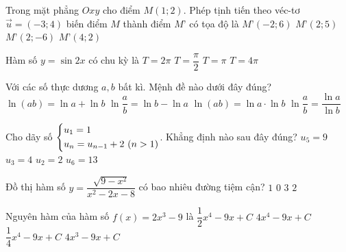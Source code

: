 \begin{ex}%
Trong mặt phẳng $Oxy$ cho điểm $M(1;2)$. Phép tịnh tiến theo véc-tơ $\overrightarrow{u} = (-3;4)$ biến điểm $M$ thành điểm $M’$ có tọa độ là
\choice
{\True $M’(-2;6)$}
{$M’(2;5)$}
{$M’(2;-6)$}
{$M’(4;2)$}
\end{ex}

\begin{ex}%
Hàm số $y=\sin 2x$ có chu kỳ là
\choice
{$T=2\pi$}
{$T=\dfrac{\pi}{2}$}
{\True $T=\pi$}
{$T=4\pi$}
\end{ex}


\begin{ex}%
Với các số thực dương $a, b$ bất kì. Mệnh đề nào dưới đây đúng?
\choice
{\True $\ln (ab) = \ln a + \ln b$}
{$\ln\dfrac{a}{b} = \ln b - \ln a$}
{$\ln (ab) = \ln a \cdot \ln b$}
{$\ln\dfrac{a}{b} = \dfrac{\ln a}{ \ln b}$}
\end{ex}


\begin{ex}%
Cho dãy số  $\left\{\begin{aligned}&u_1=1\\&u_n = u_{n-1} +2~ (n>1)\end{aligned}\right.$.  Khẳng định nào sau đây đúng?
\choice
{\True $u_5=9$}
{$u_3=4$}
{$u_2=2$}
{$u_6=13$}
\end{ex}

\begin{ex}%
Đồ thị hàm số $y=\dfrac{\sqrt{9-x^2}}{x^2-2x-8}$ có bao nhiêu đường tiệm cận?
\choice
{\True $1$}
{$0$}
{$3$}
{$2$}
\end{ex}


\begin{ex}%
Nguyên hàm của hàm số $f(x) = 2x^3-9$ là 
\choice
{\True $\dfrac{1}{2}x^4-9x+C$}
{$4x^4-9x+C$}
{$\dfrac{1}{4} x^4-9x+C$}
{$4x^3-9x+C$}
\end{ex}

